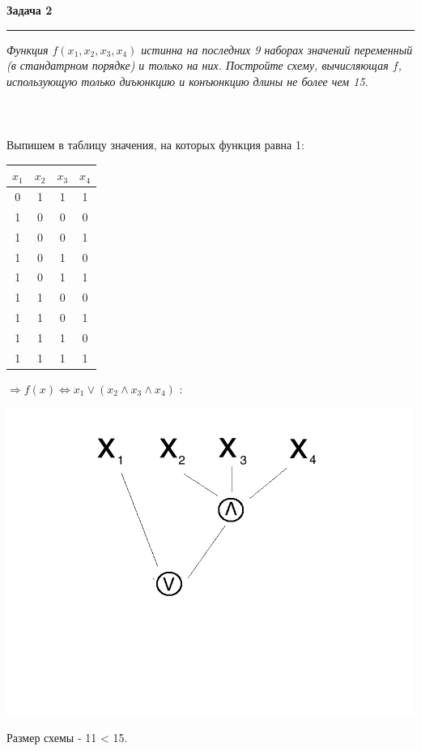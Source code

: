 \documentclass[11pt,a4paper]{scrartcl}
\begin{document}
\textbf{\Large Задача 2}
\medskip\hrule\medskip
\textsl{Функция $ f(x_1, x_2, x_3, x_4) $  истинна на последних 9 наборах значений переменный (в стандатрном порядке) и только на них. Постройте схему, вычисляющая $ f $, использующую только диъюнкцию и конъюнкцию длины не более  чем 15.}
\\ \\
 \\ \\
Выпишем в таблицу значения, на которых функция равна 1:
\begin{center}
	\begin{tabular}{|c|c|c|c|}
		\hline
		 $ x_1 $ &  $ x_2 $ & $ x_3 $ & $ x_4 $ \\
		\hline 
		0 & 1 & 1 & 1 \\ 
		\hline
		1 & 0 & 0 & 0 \\ 
		\hline
		1 & 0 & 0 & 1 \\ 
		\hline
		1 & 0 & 1 & 0 \\ 
		\hline
		1 & 0 & 1 & 1 \\ 
		\hline
		1 & 1 & 0 & 0 \\ 
		\hline
		1 & 1 & 0 & 1 \\ 
		\hline
		1 & 1 & 1 & 0 \\ 
		\hline
		1 & 1 & 1 & 1 \\ 
		\hline
	\end{tabular}
\end{center}
$ \Rightarrow f(x) \Longleftrightarrow x_1 \lor (x_2 \land x_3 \land x_4)$ : 
\begin{center}
	\includegraphics[height = 100mm]{2.png}
\end{center}
Размер схемы - 11 < 15.
\newpage
\end{document}
